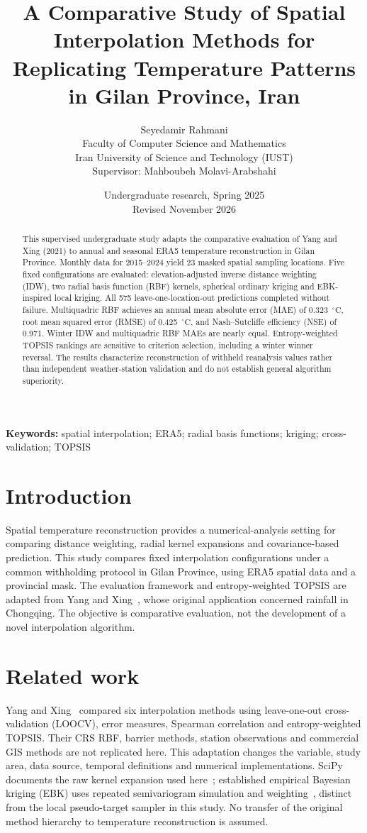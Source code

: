 \documentclass[11pt,a4paper]{article}
\title{\textbf{A Comparative Study of Spatial Interpolation Methods for Replicating Temperature Patterns in Gilan Province, Iran}}
\author{Seyedamir Rahmani\\\small Faculty of Computer Science and Mathematics\\\small Iran University of Science and Technology (IUST)\\[3pt]\small Supervisor: Mahboubeh Molavi-Arabshahi}
\date{Undergraduate research, Spring 2025\\ Revised November 2026}
\newcommand{\degC}{\ensuremath{{}^{\circ}\mathrm{C}}}
\begin{document}
\maketitle
\begin{abstract}
This supervised undergraduate study adapts the comparative evaluation of Yang and Xing (2021) to annual and seasonal ERA5 temperature reconstruction in Gilan Province. Monthly data for 2015--2024 yield 23 masked spatial sampling locations. Five fixed configurations are evaluated: elevation-adjusted inverse distance weighting (IDW), two radial basis function (RBF) kernels, spherical ordinary kriging and EBK-inspired local kriging. All 575 leave-one-location-out predictions completed without failure. Multiquadric RBF achieves an annual mean absolute error (MAE) of 0.323~\degC, root mean squared error (RMSE) of 0.425~\degC, and Nash--Sutcliffe efficiency (NSE) of 0.971. Winter IDW and multiquadric RBF MAEs are nearly equal. Entropy-weighted TOPSIS rankings are sensitive to criterion selection, including a winter winner reversal. The results characterize reconstruction of withheld reanalysis values rather than independent weather-station validation and do not establish general algorithm superiority.
\end{abstract}
\smallskip\textbf{Keywords:} spatial interpolation; ERA5; radial basis functions; kriging; cross-validation; TOPSIS

\section{Introduction}
Spatial temperature reconstruction provides a numerical-analysis setting for comparing distance weighting, radial kernel expansions and covariance-based prediction. This study compares fixed interpolation configurations under a common withholding protocol in Gilan Province, using ERA5 spatial data and a provincial mask. The evaluation framework and entropy-weighted TOPSIS are adapted from Yang and Xing~\cite{yang}, whose original application concerned rainfall in Chongqing. The objective is comparative evaluation, not the development of a novel interpolation algorithm.

\section{Related work}
Yang and Xing~\cite{yang} compared six interpolation methods using leave-one-out cross-validation (LOOCV), error measures, Spearman correlation and entropy-weighted TOPSIS. Their CRS RBF, barrier methods, station observations and commercial GIS methods are not replicated here. This adaptation changes the variable, study area, data source, temporal definitions and numerical implementations. SciPy documents the raw kernel expansion used here~\cite{rbf}; established empirical Bayesian kriging (EBK) uses repeated semivariogram simulation and weighting~\cite{ebk}, distinct from the local pseudo-target sampler in this study. No transfer of the original method hierarchy to temperature reconstruction is assumed.
\end{document}
